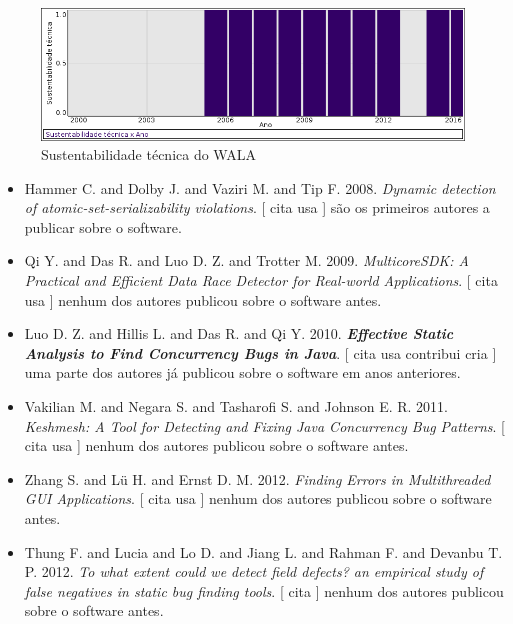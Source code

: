 \begin{figure}[h]
  \center
  \includegraphics[scale=0.50]{imagens/softwares-charts/wala.png}
  \caption{Sustentabilidade técnica do WALA}
\end{figure}


\begin{itemize}
\item Hammer C. and Dolby J. and Vaziri M. and Tip F.
      2008.
        \textit{ Dynamic detection of atomic-set-serializability violations}.
      [
          cita
          usa
      ]
são os primeiros autores a publicar sobre o software.
\item Qi Y. and Das R. and Luo D. Z. and Trotter M.
      2009.
        \textit{ MulticoreSDK: A Practical and Efficient Data Race Detector for Real-world Applications}.
      [
          cita
          usa
      ]
nenhum dos autores publicou sobre o software antes.
\item Luo D. Z. and Hillis L. and Das R. and Qi Y.
      2010.
        \textbf{\textit{ Effective Static Analysis to Find Concurrency Bugs in Java}}.
      [
          cita
          usa
          contribui
          cria
      ]
uma parte dos autores já publicou sobre o software em anos anteriores.
\item Vakilian M. and Negara S. and Tasharofi S. and Johnson E. R.
      2011.
        \textit{ Keshmesh: A Tool for Detecting and Fixing Java Concurrency Bug Patterns}.
      [
          cita
          usa
      ]
nenhum dos autores publicou sobre o software antes.
\item Zhang S. and L\"{u} H. and Ernst D. M.
      2012.
        \textit{ Finding Errors in Multithreaded GUI Applications}.
      [
          cita
          usa
      ]
nenhum dos autores publicou sobre o software antes.
\item Thung F. and Lucia and Lo D. and Jiang L. and Rahman F. and Devanbu T. P.
      2012.
        \textit{ To what extent could we detect field defects? an empirical study of false negatives in static bug finding tools}.
      [
          cita
      ]
nenhum dos autores publicou sobre o software antes.

\end{itemize}
